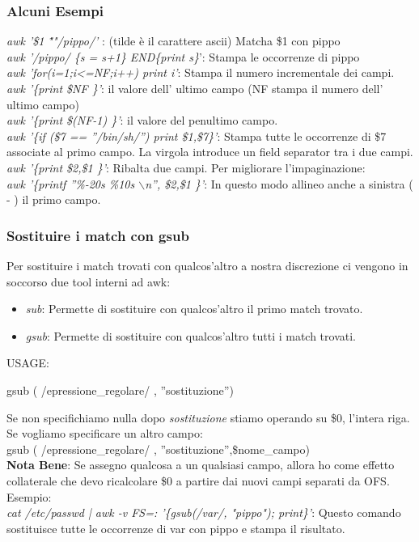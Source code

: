 \documentclass[a4paper,12pt]{article} %
\begin{document}
\subsubsection{Alcuni Esempi}
\textit{awk '\$1 \~""/pippo/'} : (tilde è il carattere ascii) Matcha \$1 con pippo\\
\textit{awk '/pippo/ \{s = s+1\} END\{print s\}}': Stampa le occorrenze di pippo\\
\textit{awk 'for(i=1;i<=NF;i++) print i'}: Stampa il numero incrementale dei campi.\\
\textit{awk '\{print \$NF \}'}: il valore dell' ultimo campo (NF stampa il numero dell' ultimo campo)\\
\textit{awk '\{print \$(NF-1) \}'}: il valore del penultimo campo.\\
\textit{awk '\{if (\$7 == ''/bin/sh/'') print \$1,\$7\}'}: Stampa tutte le occorrenze di \$7 associate al primo campo. La virgola introduce un field separator tra i due campi.
\textit{awk '\{print \$2,\$1 \}'}: Ribalta due campi. Per migliorare l'impaginazione:\\
\textit{awk '\{printf ''\%-20s  \%10s $\backslash$n'', \$2,\$1 \}'}: In questo modo allineo anche a sinistra ( - ) il primo campo.\\
 \subsubsection{Sostituire i match con gsub}
 Per sostituire i match trovati con qualcos'altro a nostra discrezione ci vengono in soccorso due tool interni ad awk:\\
 \begin{itemize}
\item \textit{sub}: Permette di sostituire con qualcos'altro il primo match trovato.
\item \textit{gsub}: Permette di sostituire con qualcos'altro tutti i match trovati.
\end{itemize}
USAGE:
\begin{center}
gsub ( /epressione\_regolare/ , ''sostituzione'')\\
\end{center}
Se non specifichiamo nulla dopo \textit{sostituzione} stiamo operando su \$0, l'intera riga.
Se vogliamo specificare un altro campo:\\
gsub ( /epressione\_regolare/ , ''sostituzione'',\$nome\_campo)\\
\textbf{Nota Bene}: Se assegno qualcosa a un qualsiasi campo, allora ho come effetto collaterale che devo ricalcolare \$0 a partire dai nuovi campi separati da OFS.\\
Esempio:\\
\textit{cat /etc/passwd | awk -v FS=:  '\{gsub(/var/, "pippo"); print\}'}: Questo comando sostituisce tutte le occorrenze di var con pippo e stampa il risultato.\\
\end{document}
